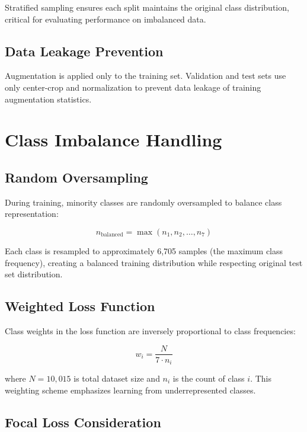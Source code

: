 Stratified sampling ensures each split maintains the original class distribution, critical for evaluating performance on imbalanced data.

\subsection{Data Leakage Prevention}

Augmentation is applied only to the training set. Validation and test sets use only center-crop and normalization to prevent data leakage of training augmentation statistics.

\section{Class Imbalance Handling}

\subsection{Random Oversampling}

During training, minority classes are randomly oversampled to balance class representation:

\begin{equation}
n_{\text{balanced}} = \max(n_1, n_2, \ldots, n_7)
\end{equation}

Each class is resampled to approximately 6,705 samples (the maximum class frequency), creating a balanced training distribution while respecting original test set distribution.

\subsection{Weighted Loss Function}

Class weights in the loss function are inversely proportional to class frequencies:

\begin{equation}
w_i = \frac{N}{7 \cdot n_i}
\end{equation}

where $N = 10,015$ is total dataset size and $n_i$ is the count of class $i$. This weighting scheme emphasizes learning from underrepresented classes.

\subsection{Focal Loss Consideration}

